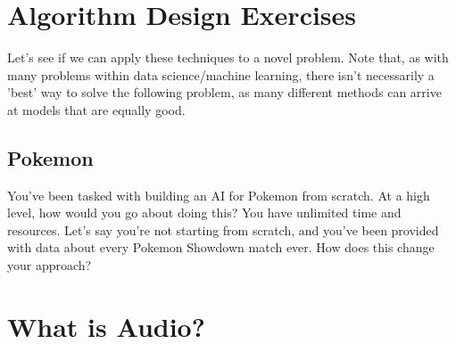 \documentclass[11pt]{article}
\begin{document}
\section{Algorithm Design Exercises}
Let's see if we can apply these techniques to a novel problem. Note that, as with many problems within data science/machine learning, there isn't necessarily a 'best' way to solve the following problem, as many different methods can arrive at models that are equally good.
\subsection{Pokemon}
You've been tasked with building an AI for Pokemon from scratch. At a high level, how would you go about doing this? You have unlimited time and resources. 
Let's say you're not starting from scratch, and you've been provided with data about every Pokemon Showdown match ever. How does this change your approach?

\section{What is Audio?}
\end{document}
